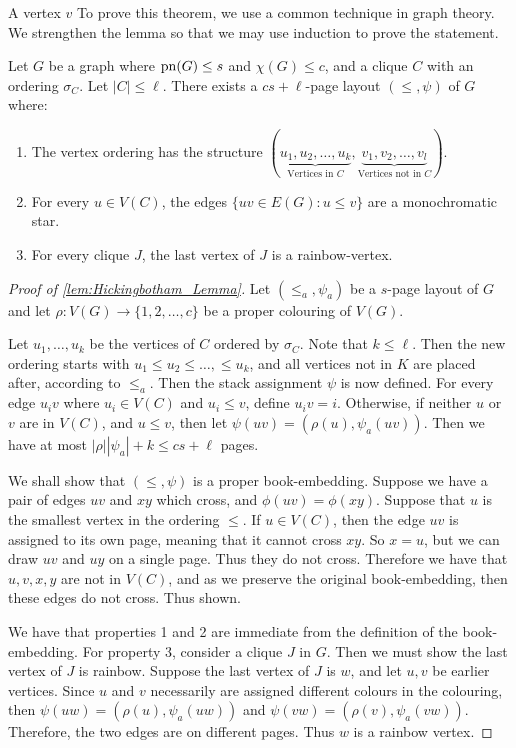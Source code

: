 A vertex $v$
To prove this theorem, we use a common technique in graph theory. We strengthen the lemma so that we may use induction to prove the statement.
\begin{lemma}\label{lem:Hickingbotham_Lemma}
	Let \(G\) be a graph where \(\operatorname{pn}(G) \leq s\) and \(\chi(G) \leq c\), and a clique \(C\) with an ordering \(\sigma_C\). Let \(|C| \leq \ell\). There exists a \(cs + \ell\)-page layout \((\leq, \psi)\) of \(G\) where:
	\begin{enumerate}
		\item The vertex ordering has the structure \((\underbrace{u_1, u_2, \ldots, u_k}_{\text{Vertices in } C}, \underbrace{v_1, v_2, \ldots, v_l}_{\text{Vertices not in }C})\).
		\item For every \(u \in V(C)\), the edges \(\lbrace uv \in E(G) : u \leq v \rbrace\) are a monochromatic star.
		\item For every clique \(J\), the last vertex of \(J\) is a rainbow-vertex.
	\end{enumerate}
\end{lemma}
\begin{proof}[Proof of \cref{lem:Hickingbotham_Lemma}]
	Let \((\leq_a, \psi_a)\) be a \(s\)-page layout of \(G\) and let \(\rho: V(G) \rightarrow \lbrace 1, 2, \ldots, c\rbrace\) be a proper colouring of \(V(G)\).

	Let \(u_1, \ldots, u_k\) be the vertices of \(C\) ordered by \(\sigma_C\). Note that \(k \leq \ell\). Then the new ordering starts with \(u_1 \leq u_2 \leq \ldots, \leq u_k\), and all vertices not in \(K\) are placed after, according to \(\leq_a\).
	Then the stack assignment \(\psi\) is now defined. For every edge \(u_i v\) where \(u_i \in V(C)\) and \(u_i \leq v\), define \(u_i v = i\). Otherwise, if neither \(u\) or \(v\) are in \(V(C)\), and \(u \leq v\), then let \(\psi(uv) = (\rho(u), \psi_a(uv))\). Then we have at most \(|\rho| |\psi_a| + k \leq cs + \ell\) pages.

	We shall show that \((\leq, \psi)\) is a proper book-embedding. Suppose we have a pair of edges \(uv\) and \(xy\) which cross, and \(\phi(uv) = \phi(xy)\). Suppose that \(u\) is the smallest vertex in the ordering \(\leq\). If \(u \in V(C)\), then the edge \(uv\) is assigned to its own page, meaning that it cannot cross \(xy\). So \(x = u\), but we can draw \(uv\) and \(uy\) on a single page. Thus they do not cross. Therefore we have that \(u, v, x, y\) are not in \(V(C)\), and as we preserve the original book-embedding, then these edges do not cross. Thus shown.
	\par
	We have that properties 1 and 2 are immediate from the definition of the book-embedding. For property 3, consider a clique \(J\) in \(G\). Then we must show the last vertex of \(J\) is rainbow. Suppose the last vertex of \(J\) is \(w\), and let \(u, v\) be earlier vertices. Since \(u\) and \(v\) necessarily are assigned different colours in the colouring, then \(\psi(uw) = (\rho(u), \psi_a(uw))\) and \(\psi(vw) = (\rho(v), \psi_a(vw))\). Therefore, the two edges are on different pages. Thus \(w\) is a rainbow vertex.
\end{proof}

